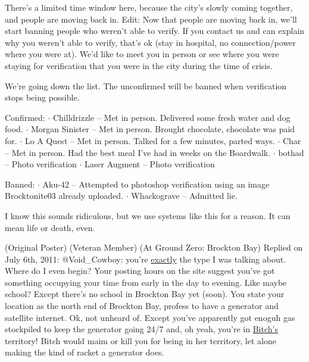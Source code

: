There's a limited time window here, because the city's slowly coming together, and people are moving back in.
Edit:  Now that people are moving back in, we'll start banning people who weren't able to verify.  If you contact us and can explain why you weren't able to verify, that's ok (stay in hospital, no connection/power where you were at).  We'd like to meet you in person or see where you were staying for verification that you were in the city during the time of crisis.



We're going down the list.  The unconfirmed will be banned when verification stops being possible.



Confirmed:
$\cdot$  Chilldrizzle – Met in person.  Delivered some fresh water and dog food.
$\cdot$  Morgan Sinister – Met in person.  Brought chocolate, chocolate was paid for.
$\cdot$  Lo A Quest – Met in person.  Talked for a few minutes, parted ways.
$\cdot$  Char – Met in person.  Had the best meal I've had in weeks on the Boardwalk.
$\cdot$  bothad – Photo verification
$\cdot$  Laser Augment – Photo verification



Banned:
$\cdot$  Aku-42 – Attempted to photoshop verification using an image Brocktonite03 already uploaded.
$\cdot$  Whackograve – Admitted lie.



I know this sounds ridiculous, but we use systems like this for a reason.  It can mean life or death, even.






\blacktriangleright  {} (Original Poster) (Veteran Member) (At Ground Zero: Brockton Bay)
Replied on July 6th, 2011:
@Void_Cowboy: you're \underline{exactly} the type I was talking about.  Where do I even begin?
Your posting hours on the site suggest you've got something occupying your time from early in the day to evening.  Like maybe school?  Except there's no school in Brockton Bay yet (soon).  You state your location as the north end of Brockton Bay, profess to have a generator and satellite internet.  Ok, not unheard of.  Except you've apparently got enoguh gas stockpiled to keep the generator going 24/7 and, oh yeah, you're in \underline{Bitch's} territory!  Bitch would maim or kill you for being in her territory, let alone making the kind of racket a generator does.



